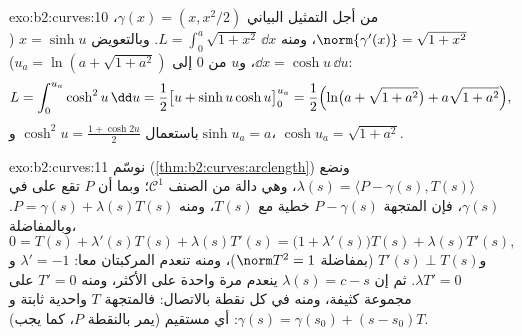 \begin{solution}{exo:b2:curves:10}
من أجل التمثيل البياني $\gamma(x) = (x, x^2/2)$، $\norm{\gamma'(x)} =
\sqrt{1 + x^2}$، ومنه $L = \int_0^a\sqrt{1+x^2}\,\dd x$.
وبالتعويض $x = \sinh u$ ($\dd x = \cosh u\,\dd u$، و$u$ من $0$ إلى $u_a = \ln(a + \sqrt{1+a^2})$):
\[
L = \int_0^{u_a}\cosh^2 u\,\dd u
= \frac12\bigl[u + \sinh u\cosh u\bigr]_0^{u_a}
= \frac12\Bigl(\ln\bigl(a + \sqrt{1+a^2}\bigr) +
a\sqrt{1+a^2}\Bigr),
\]
باستعمال $\cosh^2 u = \frac{1 + \cosh 2u}2$ و$\sinh u_a = a$، $\cosh u_a = \sqrt{1 + a^2}$.
\end{solution}

\begin{solution}{exo:b2:curves:11}
نوسّم  (\cref{thm:b2:curves:arclength}) ونضع $\lambda(s) =
\langle P - \gamma(s), T(s)\rangle$، وهي دالة من الصنف $\mathcal C^1$؛
وبما أن $P$ تقع على  في $\gamma(s)$، فإن المتجهة $P - \gamma(s)$ خطية مع
$T(s)$، ومنه $P =
\gamma(s) + \lambda(s)T(s)$. وبالمفاضلة،
\[
0 = T(s) + \lambda'(s)T(s) + \lambda(s)T'(s)
= \bigl(1 + \lambda'(s)\bigr)T(s) + \lambda(s)T'(s),
\]
و$T'(s) \perp T(s)$ (بمفاضلة $\norm T^2 = 1$)، ومنه تنعدم المركبتان معا: $\lambda' = -1$ و$\lambda T' = 0$.
ثم إن $\lambda(s) = c - s$ ينعدم مرة واحدة على الأكثر، ومنه $T' = 0$ على مجموعة
كثيفة، ومنه في كل نقطة بالاتصال: فالمتجهة $T$ واحدية ثابتة
و$\gamma(s) = \gamma(s_0) + (s -
s_0)T$: أي مستقيم (يمر بالنقطة $P$، كما يجب).
\end{solution}


